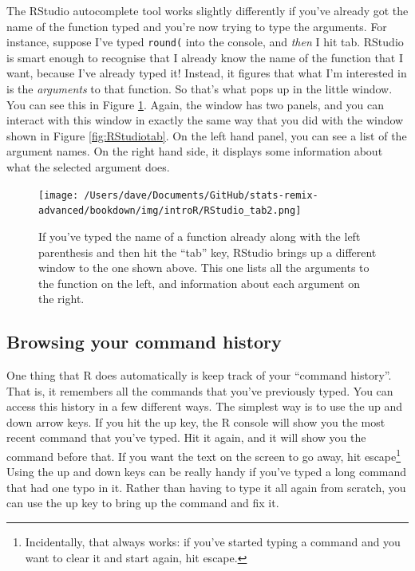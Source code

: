 \documentclass[
]{book}
\begin{document}
The RStudio autocomplete tool works slightly differently if you've already got the name of the function typed and you're now trying to type the arguments. For instance, suppose I've typed \texttt{round(} into the console, and \emph{then} I hit tab. RStudio is smart enough to recognise that I already know the name of the function that I want, because I've already typed it! Instead, it figures that what I'm interested in is the \emph{arguments} to that function. So that's what pops up in the little window. You can see this in Figure \ref{fig:RStudiotab2}. Again, the window has two panels, and you can interact with this window in exactly the same way that you did with the window shown in Figure \ref{fig:RStudiotab}. On the left hand panel, you can see a list of the argument names. On the right hand side, it displays some information about what the selected argument does.

\begin{figure}
\centering
\texttt{[image: /Users/dave/Documents/GitHub/stats-remix-advanced/bookdown/img/introR/RStudio\_tab2.png]}
\caption{\label{fig:RStudiotab2}If you've typed the name of a function already along with the left parenthesis and then hit the ``tab'' key, RStudio brings up a different window to the one shown above. This one lists all the arguments to the function on the left, and information about each argument on the right.}
\end{figure}

\hypertarget{browsing-your-command-history}{%
\subsection{Browsing your command history}\label{browsing-your-command-history}}

One thing that R does automatically is keep track of your ``command history''. That is, it remembers all the commands that you've previously typed. You can access this history in a few different ways. The simplest way is to use the up and down arrow keys. If you hit the up key, the R console will show you the most recent command that you've typed. Hit it again, and it will show you the command before that. If you want the text on the screen to go away, hit escape\footnote{Incidentally, that always works: if you've started typing a command and you want to clear it and start again, hit escape.} Using the up and down keys can be really handy if you've typed a long command that had one typo in it. Rather than having to type it all again from scratch, you can use the up key to bring up the command and fix it.
\end{document}
